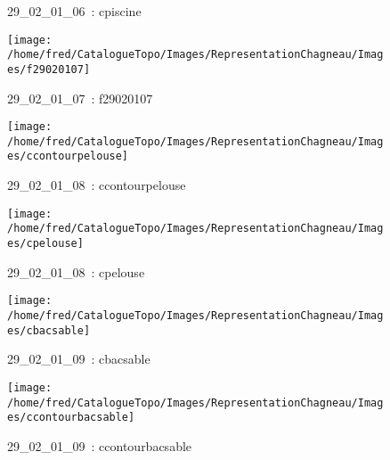 \documentclass[12pt,titlepage]{book}
\begin{document}
\begin{figure}[h!]
\begin{minipage}[t]{3cm}
\begin{center}
      \caption[~29\_02\_01\_06]{\small{29\_02\_01\_06~:} \tiny{cpiscine}}\label{cpiscine}
    \end{center}
  \end{minipage}
  \begin{minipage}[t]{3cm}
    \begin{center}
      \texttt{[image: /home/fred/CatalogueTopo/Images/RepresentationChagneau/Images/f29020107]}
      \caption[~29\_02\_01\_07]{\small{29\_02\_01\_07~:} \tiny{f29020107}}\label{f29020107}
    \end{center}
  \end{minipage}
  \begin{minipage}[t]{3cm}
    \begin{center}
      \texttt{[image: /home/fred/CatalogueTopo/Images/RepresentationChagneau/Images/ccontourpelouse]}
      \caption[~29\_02\_01\_08]{\small{29\_02\_01\_08~:} \tiny{ccontourpelouse}}\label{ccontourpelouse}
    \end{center}
  \end{minipage}
  \begin{minipage}[t]{3cm}
    \begin{center}
      \texttt{[image: /home/fred/CatalogueTopo/Images/RepresentationChagneau/Images/cpelouse]}
      \caption[~29\_02\_01\_08]{\small{29\_02\_01\_08~:} \tiny{cpelouse}}\label{cpelouse}
    \end{center}
  \end{minipage}
  \begin{minipage}[t]{3cm}
    \begin{center}
      \texttt{[image: /home/fred/CatalogueTopo/Images/RepresentationChagneau/Images/cbacsable]}
      \caption[~29\_02\_01\_09]{\small{29\_02\_01\_09~:} \tiny{cbacsable}}\label{cbacsable}
    \end{center}
  \end{minipage}
  \begin{minipage}[t]{3cm}
    \begin{center}
      \texttt{[image: /home/fred/CatalogueTopo/Images/RepresentationChagneau/Images/ccontourbacsable]}
      \caption[~29\_02\_01\_09]{\small{29\_02\_01\_09~:} \tiny{ccontourbacsable}}\label{ccontourbacsable}
    \end{center}

\end{minipage}
\end{figure}
\end{document}
